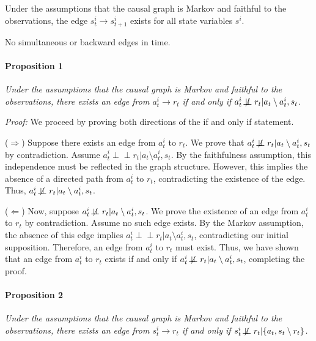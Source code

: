 \begin{assumption}
Under the assumptions that the causal graph is Markov and faithful to the observations, the edge $s^i_t \to  s^i_{t+1}$ exists for all state variables $s^i$.
\end{assumption}

\begin{assumption}
No simultaneous or backward edges in time.
\end{assumption}

\paragraph{Proposition 1}
\textit{Under the assumptions that the causal graph is Markov and faithful to the observations, there exists an edge from $a^i_t \to r_t$ if and only if $a^i_t \not \! \perp \!\!\! \perp r_t | { a_t \setminus a^i_t, s_t }$.}

\textit{Proof:} We proceed by proving both directions of the if and only if statement.

($\Rightarrow$) Suppose there exists an edge from $a^i_t$ to $r_t$. We prove that $a^i_t \not \! \perp \!\!\! \perp r_t | { a_t \setminus a^i_t, s_t }$ by contradiction. Assume $a^i_t \! \perp \!\!\! \perp r_t | { a_t \setminus a^i_t, s_t }$. By the faithfulness assumption, this independence must be reflected in the graph structure. However, this implies the absence of a directed path from $a^i_t$ to $r_t$, contradicting the existence of the edge. Thus, $a^i_t \not \! \perp \!\!\! \perp r_t | { a_t \setminus a^i_t, s_t }$.

($\Leftarrow$) Now, suppose $a^i_t \not \! \perp \!\!\! \perp r_t | { a_t \setminus a^i_t, s_t }$. We prove the existence of an edge from $a^i_t$ to $r_t$ by contradiction. Assume no such edge exists. By the Markov assumption, the absence of this edge implies $a^i_t  \! \perp \!\!\! \perp r_t | { a_t \setminus a^i_t, s_t }$, contradicting our initial supposition. Therefore, an edge from $a^i_t$ to $r_t$ must exist.
Thus, we have shown that an edge from $a^i_t$ to $r_t$ exists if and only if $a^i_t \not \! \perp \!\!\! \perp r_t | { a_t \setminus a^i_t, s_t }$, completing the proof.
\paragraph{Proposition 2} 
\textit{Under the assumptions that the causal graph is Markov and faithful to the observations, there exists an edge from $s^i_t \to r_t$ if and only if $s^i_t \not \! \perp \!\!\! \perp r_t | \{a_t, s_t  \setminus r_t\}$.}

